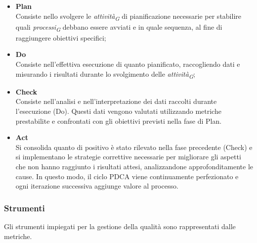 \begin{itemize}
    \item \textbf{Plan} \\
    Consiste nello svolgere le \textit{attività}\textsubscript{\textit{G}} di pianificazione necessarie per stabilire quali \textit{processi}\textsubscript{\textit{G}} debbano essere avviati e in quale sequenza, al fine di raggiungere obiettivi specifici;
    \item \textbf{Do} \\
    Consiste nell'effettiva esecuzione di quanto pianificato, raccogliendo dati e misurando i risultati durante lo svolgimento delle \textit{attività}\textsubscript{\textit{G}};
    \item \textbf{Check} \\
    Consiste nell'analisi e nell'interpretazione dei dati raccolti durante l'esecuzione (Do). Questi dati vengono valutati utilizzando metriche prestabilite e confrontati con gli obiettivi previsti nella fase di Plan.
    \item \textbf{Act} \\
    Si consolida quanto di positivo è stato rilevato nella fase precedente (Check) e si implementano le strategie correttive necessarie per migliorare gli aspetti che non hanno raggiunto i risultati attesi, analizzandone approfonditamente le cause. In questo modo, il ciclo PDCA viene continuamente perfezionato e ogni iterazione successiva aggiunge valore al processo.
\end{itemize}
\pagebreak

\subsubsection{Strumenti}
Gli strumenti impiegati per la gestione della qualità sono rappresentati dalle metriche.

